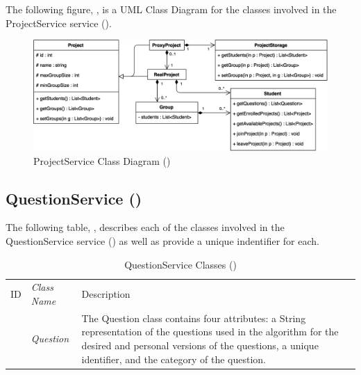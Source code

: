 \documentclass[12pt,letterpaper]{article}
\begin{document}
The following figure, , is a UML Class Diagram for the classes involved in the ProjectService service ().

\begin{figure}[H]
	\centering{}
	\includegraphics[scale=0.33]{imgs/d3/interfaces/project.png}
	\caption{ProjectService Class Diagram ()}
\end{figure}

\subsection{QuestionService ()}

The following table, , describes each of the classes involved in the QuestionService service () as well as provide a unique indentifier for each.

\begin{table}[H]
	\caption{QuestionService Classes ()} 
	\begin{tabu} to 
	    \tableheader{}ID & Class Name & Description \\
		 & Question & The Question class contains four attributes: a String representation of the questions used in the algorithm for the desired and personal versions of the questions, a unique identifier, and the category of the question. \\
	\end{tabu}
\end{table}
\end{document}
